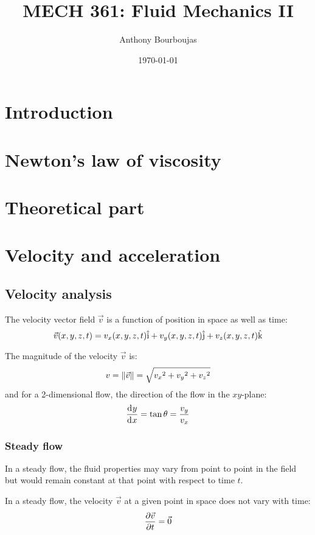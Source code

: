 \documentclass[10pt, twocolumn]{article}
\title{MECH 361: Fluid Mechanics II}
\date{\today}
\author{Anthony Bourboujas}
\begin{document}
\maketitle %
\section{Introduction}



\section{Newton's law of viscosity}



\section{Theoretical part}



\section{Velocity and acceleration}
\subsection{Velocity analysis}
The velocity vector field \(\vec{v}\) is a function of position in space as well as time:
\[
  \vec{v}(x, y, z, t) = v_x(x, y, z, t)\hat{\mathrm{i}} + v_y(x, y, z, t)\hat{\mathrm{j}} + v_z(x, y, z, t)\hat{\mathrm{k}}
\]

The magnitude of the velocity \(\vec{v}\) is:
\[
  v = \left\| \vec{v} \right\| = \sqrt{{v_x}^2 + {v_y}^2 + {v_z}^2}
\]
and for a 2-dimensional flow, the direction of the flow in the \(xy\)-plane:
\[
  \frac{\mathrm{d}^{} y}{\mathrm{d}^{} x} = \tan\theta = \frac{v_y}{v_x}
\]


\subsubsection{Steady flow}
In a steady flow, the fluid properties may vary from point to point in the field but would remain constant at that point with respect to time \(t\).

In a steady flow, the velocity \(\vec{v}\) at a given point in space does not vary with time:
\[
  \frac{\partial \vec{v}}{\partial t} = \vec{0}
\]
\end{document}
